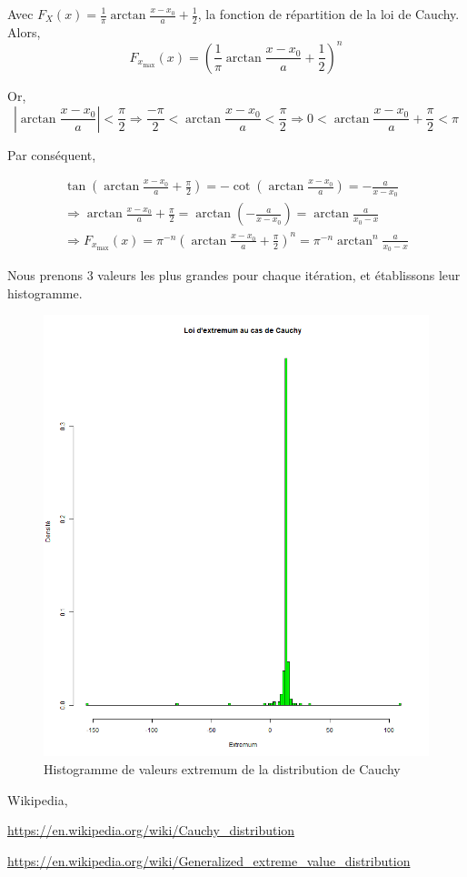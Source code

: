 \documentclass[12pt,a4paper,titlepage]{article}
\numberwithin{equation}{section}
\begin{document}
Avec ${F_X}\left( x \right) = \frac{1}{\pi }\arctan \frac{{x - {x_0}}}{a} + \frac{1}{2}$, la fonction de répartition de la loi de Cauchy. Alors, \[{F_{{x_{\max }}}}\left( x \right) = {\left( {\frac{1}{\pi }\arctan \frac{{x - {x_0}}}{a} + \frac{1}{2}} \right)^n}\]

Or, \[\left| {\arctan \frac{{x - {x_0}}}{a}} \right| < \frac{\pi }{2} \Rightarrow \frac{{ - \pi }}{2} < \arctan \frac{{x - {x_0}}}{a} < \frac{\pi }{2} \Rightarrow 0 < \arctan \frac{{x - {x_0}}}{a} + \frac{\pi }{2} < \pi \]

Par conséquent,

\[\begin{array}{l}
\tan \left( {\arctan \frac{{x - {x_0}}}{a} + \frac{\pi }{2}} \right) =  - \cot \left( {\arctan \frac{{x - {x_0}}}{a}} \right) =  - \frac{a}{{x - {x_0}}}\\
 \Rightarrow \arctan \frac{{x - {x_0}}}{a} + \frac{\pi }{2} = \arctan \left( { - \frac{a}{{x - {x_0}}}} \right) = \arctan \frac{a}{{{x_0} - x}}\\
 \Rightarrow {F_{{x_{\max }}}}\left( x \right) = {\pi ^{ - n}}{\left( {\arctan \frac{{x - {x_0}}}{a} + \frac{\pi }{2}} \right)^n} = {\pi ^{ - n}}{\arctan ^n}\frac{a}{{{x_0} - x}}
\end{array}\]

Nous prenons 3 valeurs les plus grandes pour chaque itération, et établissons leur histogramme.




\begin{figure}[!h]
\centering
\includegraphics[width=0.8\linewidth]{images/Cauchy_extremum.png}
\caption{Histogramme de valeurs extremum de la distribution de Cauchy}
\end{figure}


\clearpage

\begin{thebibliography}{3}

Wikipedia,

\url{https://en.wikipedia.org/wiki/Cauchy_distribution}

\url{https://en.wikipedia.org/wiki/Generalized_extreme_value_distribution}

\end{thebibliography}
\end{document}
